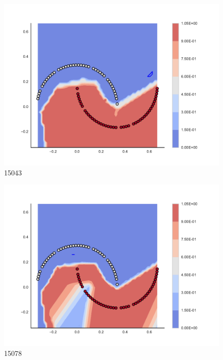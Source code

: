 \begin{subfigure}[b]{0.09\textwidth}
    \includegraphics[clip, trim=2.35cm 1.75cm 4.5cm 0cm,width=\textwidth]{img/convergence/15043.pdf}
    \caption{15043}
    \label{fig:convergence_15043}
\end{subfigure}
%
\begin{subfigure}[b]{0.09\textwidth}
    \includegraphics[clip, trim=2.35cm 1.75cm 4.5cm 0cm,width=\textwidth]{img/convergence/15078.pdf}
    \caption{15078}
    \label{fig:convergence_15078}
\end{subfigure}
%
